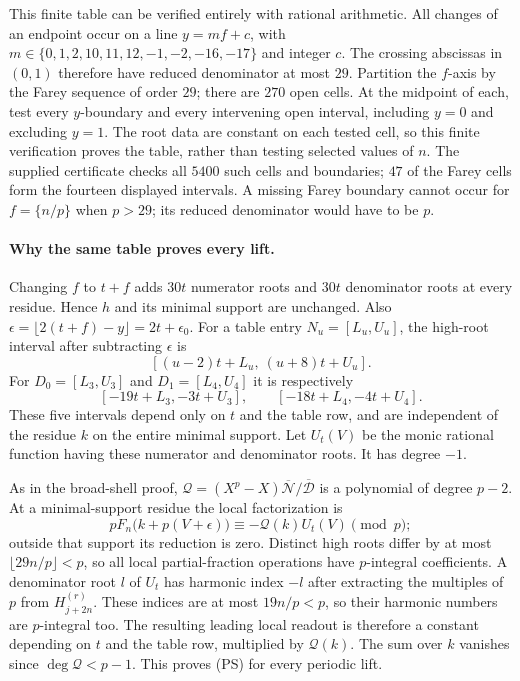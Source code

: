 This finite table can be verified entirely with rational arithmetic.
All changes of an endpoint occur on a line
$y=mf+c$, with $m\in\{0,1,2,10,11,12,-1,-2,-16,-17\}$ and integer $c$.
The crossing abscissas in $(0,1)$ therefore have reduced denominator at
most $29$.  Partition the $f$-axis by the Farey sequence of order $29$;
there are $270$ open cells.  At the midpoint of each, test every
$y$-boundary and every intervening open interval, including $y=0$ and
excluding $y=1$.  The root data are constant on each tested cell, so this
finite verification proves the table, rather than testing selected
values of $n$.  The supplied certificate checks all $5400$ such cells
and boundaries; $47$ of the Farey cells form the fourteen displayed
intervals.  A missing Farey boundary cannot occur for $f=\{n/p\}$ when
$p>29$; its reduced denominator would have to be $p$.

\paragraph{Why the same table proves every lift.}
Changing $f$ to $t+f$ adds $30t$ numerator roots and $30t$ denominator
roots at every residue.  Hence $h$ and its minimal support are unchanged.
Also $\epsilon=\lfloor2(t+f)-y\rfloor=2t+\epsilon_0$.
For a table entry $N_u=[L_u,U_u]$, the high-root interval after subtracting
$\epsilon$ is
\[
 [(u-2)t+L_u,\ (u+8)t+U_u].
\]
For $D_0=[L_3,U_3]$ and $D_1=[L_4,U_4]$ it is respectively
\[
 [-19t+L_3,-3t+U_3],\qquad[-18t+L_4,-4t+U_4].
\]
These five intervals depend only on $t$ and the table row, and are
independent of the residue $k$ on the entire minimal support.  Let
$U_t(V)$ be the monic rational function having these numerator and
denominator roots.  It has degree $-1$.

As in the broad-shell proof,
$\mathcal Q=(X^p-X)\overline{\mathcal N}/\overline{\mathcal D}$ is a
polynomial of degree $p-2$.  At a minimal-support residue the local
factorization is
\[
 pF_n\bigl(k+p(V+\epsilon)\bigr)
       \equiv-\mathcal Q(k)U_t(V)\pmod p;
\]
outside that support its reduction is zero.  Distinct high roots differ
by at most $\lfloor29n/p\rfloor<p$, so all local partial-fraction
operations have $p$-integral coefficients.  A denominator root $l$ of
$U_t$ has harmonic index $-l$ after extracting the multiples of $p$ from
$H_{j+2n}^{(r)}$.  These indices are at most $19n/p<p$, so their harmonic
numbers are $p$-integral too.  The resulting leading local readout is
therefore a constant depending on $t$ and the table row, multiplied by
$\mathcal Q(k)$.  The sum over $k$ vanishes since
$\deg\mathcal Q<p-1$.  This proves (PS) for every periodic lift.

